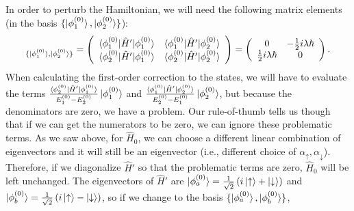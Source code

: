 \documentclass[10pt]{article}
\newcommand{\1}{\mathbf 1}
\begin{document}
In order to perturb the Hamiltonian, we will need the following matrix elements (in the basis  $\{\ket{\phi_1^{(0)}},\ket{\phi_2^{(0)}}\}$):
\begin{align}
	[\hat H']_{\{\ket{\phi_1^{(0)}},\ket{\phi_2^{(0)}}\}}
	=
	\left(
		\begin{array}{cc}
			\braket{\phi_1^{(0)} | \hat H' | \phi_1^{(0)}} & \braket{\phi_1^{(0)} | \hat H' | \phi_2^{(0)}}\\
			\braket{\phi_2^{(0)} | \hat H' | \phi_1^{(0)}} & \braket{\phi_2^{(0)} | \hat H' | \phi_2^{(0)}}
		\end{array}
	\right)
	=
	\left(
\begin{array}{cc}
 0 & -\frac{1}{2} i \lambda  \hbar  \\
 \frac{1}{2} i \lambda  \hbar & 0 \\
\end{array}
\right).
\end{align}
When calculating the first-order correction to the states, we will have to evaluate the terms $\frac{\braket{\phi_2^{(0)} | \hat H' | \phi_1^{(0)}}}{E_1^{(0)} - E_2^{(0)}} \ket{\phi_1^{(0)}}$ and $\frac{\braket{\phi_1^{(0)} | \hat H' | \phi_2^{(0)}}}{E_2^{(0)} - E_1^{(0)}} \ket{\phi_2^{(0)}}$, but because the denominators are zero, we have a problem.
Our rule-of-thumb tells us though that if we can get the numerators to be zero, we can ignore these problematic terms.
As we saw above, for $\hat H_0$, we can choose a different linear combination of eigenvectors and it will still be an eigenvector (i.e., different choice of $\alpha_\uparrow,\alpha_\downarrow$).
Therefore, if we diagonalize $\hat H'$ so that the problematic terms are zero, $\hat H_0$ will be left unchanged.
The eigenvectors of $\hat H'$ are $\ket{\phi_a^{(0)}}=\frac{1}{\sqrt{2}} \left(i\ket{\uparrow} +  \ket{\downarrow}\right)$ and $\ket{\phi_b^{(0)}}=\frac{1}{\sqrt{2}} \left(i\ket{\uparrow} -  \ket{\downarrow}\right)$, so if we change to the basis $\{\ket{\phi_a^{(0)}},\ket{\phi_b^{(0)}}\}$,
\end{document}
